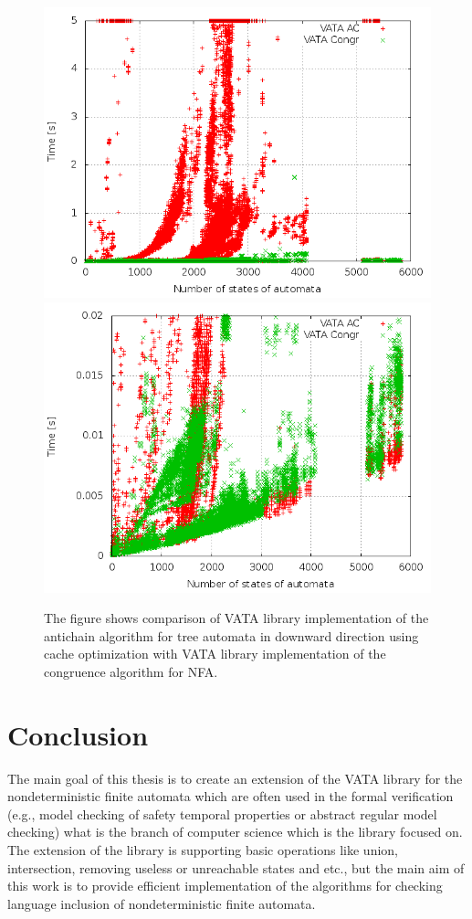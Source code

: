 \begin{figure}[bt]
\begin{center}
\includegraphics[scale=0.3]{fig/plot_ca_zprava.png}
\includegraphics[scale=0.3]{fig/plot_ca_step_zprava.png}
\label{figPlotCa}
\caption{The figure shows
 comparison of VATA library implementation of the antichain algorithm for tree automata in downward direction using cache optimization 
 with VATA library implementation of the congruence algorithm for NFA.}
\end{center}
\end{figure}

\chapter{Conclusion}
\label{concl}
The main goal of this thesis is to create an extension of the VATA library for the nondeterministic finite automata 
which are often used in the formal verification (e.g., model checking of safety temporal properties or 
abstract regular model checking) what is the branch of computer science which is the library focused on. The extension of the library is supporting
basic operations like union, intersection, removing useless or unreachable states and etc., but the main aim of this work is to provide
efficient implementation of the algorithms for checking language inclusion of nondeterministic finite automata.

